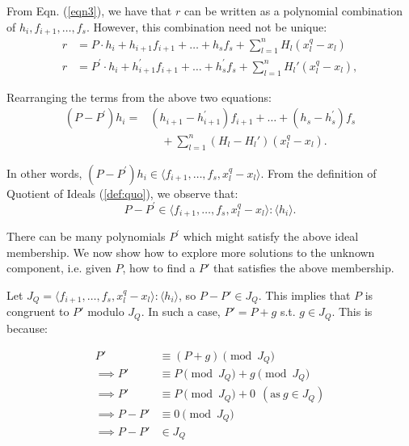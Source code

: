 From Eqn. (\ref{eqn3}), we have that $r$ can be written as a
polynomial combination of $h_i,f_{i+1},\dots, f_s$. However, this
combination need not be unique:
\begin{align*}
r &= P\cdot h_i+h_{i+1}f_{i+1}+\dots+h_sf_s+ \sum_{l=1}^n H_l (x_l^q-x_l)\\
r&= P^{'}\cdot h_i+h_{i+1}^{'}f_{i+1}+\dots+h_s^{'}f_s+\sum_{l=1}^n H_l' (x_l^q-x_l),
\end{align*}

Rearranging the terms from the above two equations:
\begin{equation}
  \begin{split}
(P-P^{'})h_i = &
    (h_{i+1}-h_{i+1}^{'})f_{i+1}+\dots+(h_{s}-h_{s}^{'})f_s\\
    & \quad + \sum_{l=1}^n (H_l-H_l') (x_l^q-x_l).
  \end{split}
\end{equation}

In other words, 
$(P-P^{'})h_i \in \langle f_{i+1},\dots,f_s,x_l^q-x_l\rangle$. 
From the definition of Quotient of Ideals (\autoref{def:quo}), we
observe that:
\vspace{0.1in}
\begin{equation}
\label{quotcomp}
P-P^{'} \in \langle f_{i+1},\dots,f_s,x_l^q-x_l\rangle : \langle h_i\rangle.
\end{equation}

There can be many polynomials $P^{'}$ which might satisfy the above
ideal membership. We now show how to explore more
solutions to the unknown component, i.e. given $P$, how to find a $P'$
that satisfies the above membership.  

Let $J_{Q} = \langle f_{i+1},\dots,f_s,x_l^q-x_l\rangle : \langle
h_i\rangle$, so $P - P' \in J_Q$. This implies that $P$ is congruent
to $P'$ modulo $J_Q$. In such a case, $P' = P + g$ s.t. $g\in
J_Q$. This is because:

\begin{align*}
  P' &\equiv (P + g) \pmod{J_Q}\\
\implies  P' &\equiv P \pmod{ J_Q} + g \pmod{J_Q}\\
\implies  P' &\equiv P \pmod{ J_Q} + 0 ~~(\text{as} ~g \in J_Q)  \\
\implies  P-P' &\equiv 0 \pmod{ J_Q}\\
\implies  P-P' & \in { J_Q}
\end{align*}

